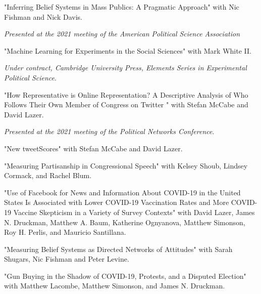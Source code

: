\documentclass[letterpaper]{article}
\renewenvironment{itemize}{
  \begin{list}{}{
    \setlength{\leftmargin}{1.5em}
  }
}{
  \end{list}
}
\begin{document}
\begin{itemize}

\item "Inferring Belief Systems in Mass Publics: A Pragmatic Approach" with Nic Fishman and Nick Davis.
\begin{itemize}
\item \textit{Presented at the 2021 meeting of the American Political Science Association}
\end{itemize} 

\item "Machine Learning for Experiments in the Social Sciences" with Mark White II.
\begin{itemize}
\item  \textit{Under contract, Cambridge University Press, Elements Series in Experimental Political Science}.
\end{itemize}

\item "How Representative is Online Representation? A Descriptive Analysis of Who Follows Their Own Member of Congress on Twitter " with Stefan McCabe and David Lazer.
\begin{itemize}
\item \textit{Presented at the 2021 meeting of the Political Networks Conference}.
\end{itemize} 

\item "New tweetScores" with Stefan McCabe and David Lazer.

\item "Measuring Partisanship in Congressional Speech" with Kelsey Shoub, Lindsey Cormack, and Rachel Blum.

\item "Use of Facebook for News and Information About COVID-19 in the United States Is Associated with Lower COVID-19 Vaccination Rates and More COVID-19 Vaccine Skepticism in a Variety of Survey Contexts" with David Lazer, James N. Druckman, Matthew A. Baum, Katherine Ognyanova, Matthew Simonson, Roy H. Perlis, and Mauricio Santillana.

\item "Measuring Belief Systems as Directed Networks of Attitudes" with Sarah Shugars, Nic Fishman and Peter Levine.

\item "Gun Buying in the Shadow of COVID-19, Protests, and a Disputed Election" with Matthew Lacombe, Matthew Simonson, and James N. Druckman.

\end{itemize}
\end{document}
